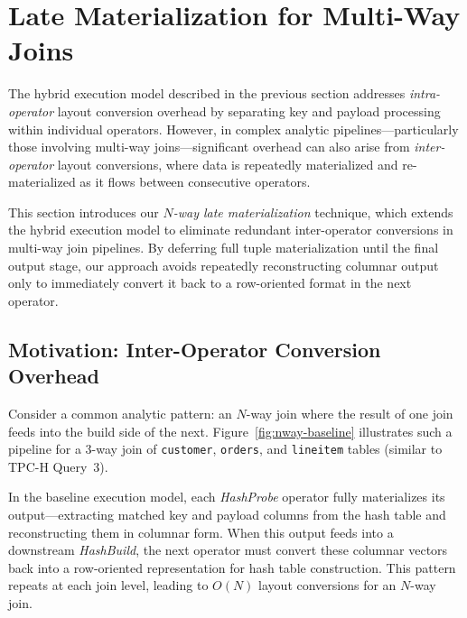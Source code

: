 \section{Late Materialization for Multi-Way Joins}
\label{sec:late_m}

The hybrid execution model described in the previous section addresses \emph{intra-operator} layout conversion overhead by separating key and payload processing within individual operators.
However, in complex analytic pipelines—particularly those involving multi-way joins—significant overhead can also arise from \emph{inter-operator} layout conversions, where data is repeatedly materialized and re-materialized as it flows between consecutive operators.

This section introduces our \emph{$N$-way late materialization} technique, which extends the hybrid execution model to eliminate redundant inter-operator conversions in multi-way join pipelines.
By deferring full tuple materialization until the final output stage, our approach avoids repeatedly reconstructing columnar output only to immediately convert it back to a row-oriented format in the next operator.

\subsection{Motivation: Inter-Operator Conversion Overhead}

Consider a common analytic pattern: an $N$-way join where the result of one join feeds into the build side of the next.
Figure~\ref{fig:nway-baseline} illustrates such a pipeline for a 3-way join of \texttt{customer}, \texttt{orders}, and \texttt{lineitem} tables (similar to TPC-H Query~3).

In the baseline execution model, each \emph{HashProbe} operator fully materializes its output—extracting matched key and payload columns from the hash table and reconstructing them in columnar form.
When this output feeds into a downstream \emph{HashBuild}, the next operator must convert these columnar vectors back into a row-oriented representation for hash table construction.
This pattern repeats at each join level, leading to $O(N)$ layout conversions for an $N$-way join.


